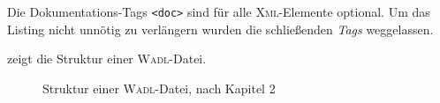 Die Dokumentations-Tags \texttt{<doc>} sind für alle \textsc{Xml}-Elemente optional.
Um das Listing nicht unnötig zu verlängern wurden die schließenden \emph{Tags} weggelassen.

 zeigt die Struktur einer \textsc{Wadl}-Datei.

\newpage

\begin{figure}
    \centering
    \resizebox{!}{\textwidth}{
        
    }
    \caption{Struktur einer \textsc{Wadl}-Datei, nach Kapitel 2 \cite{hadleyWADL}}
    \label{fig:wadlstructure}
\end{figure}